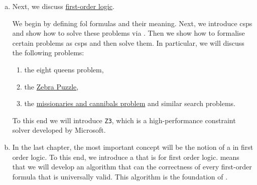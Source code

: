 \begin{enumerate}[(a)]
      As propositional logic is easier to grasp than first-order logic, we start our investigation
      of logic with propositional logic.  Furthermore, propositional logic has the advantage of
      being :  We will present an algorithm that can check whether a propositional formula
      is satisfiable.  In contrast to propositional logic, first-order logic is not decidable.

      Next, we discuss applications of propositional logic:  We will show how the  
      can be reduced to the question whether a formula from propositional logic is satisfiable.  We present
      the algorithm of  that can decide the satisfiability of a propositional formula.
      We will use it to solve various logical puzzles.  In particular, we solve
      \begin{enumerate}
      \item the \href{https://en.wikipedia.org/wiki/Eight_queens_puzzle}{8 queens puzzle}, and
      \item a \href{https://en.wikipedia.org/wiki/Sudoku}{Sudoku puzzle}.
      \end{enumerate}
\item Next, we discuss \href{https://en.wikipedia.org/wiki/First-order_logic}{first-order logic}.

      We begin by defining \gls{fol} formulas and their meaning.  Next, we introduce \glspl{csp}
      and show how to solve these problems via .  Then we show how to formalise certain problems
      as \glspl{csp} and then solve them.  In particular, we will discuss the following problems:
      \begin{enumerate}
      \item the eight queens problem,
      \item the \href{https://en.wikipedia.org/wiki/Zebra_Puzzle}{Zebra Puzzle},
      \item the \href{https://en.wikipedia.org/wiki/Missionaries_and_cannibals_problem}{missionaries and
            cannibals problem} and similar search problems.
      \end{enumerate}
      To this end we will introduce \texttt{Z3}, which is a high-performance constraint solver developed by
      Microsoft.
      
      
\item In the last chapter,      
      the most important concept will be the notion of a  in
      first order logic.  To this end, we introduce a  that is
       for first order logic.   means that we will develop an
      algorithm that can  the correctness of every first-order formula that is
      universally valid.  This algorithm is the foundation of .


\end{enumerate}
